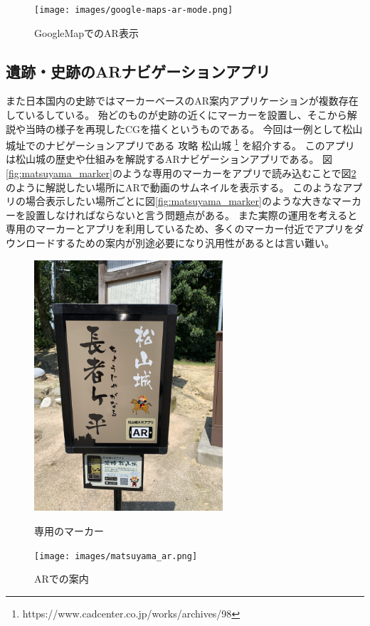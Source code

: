 \begin{figure}[h]
  \begin{center}
      \texttt{[image: images/google-maps-ar-mode.png]}
  \end{center}
  \caption{GoogleMapでのAR表示} \label{fig:googleMapAr}
\end{figure}

\subsection{遺跡・史跡のARナビゲーションアプリ}
また日本国内の史跡ではマーカーベースのAR案内アプリケーションが複数存在しているしている。
殆どのものが史跡の近くにマーカーを設置し、そこから解説や当時の様子を再現したCGを描くというものである。
今回は一例として松山城址でのナビゲーションアプリである 攻略 松山城 \footnote{https://www.cadcenter.co.jp/works/archives/98} を紹介する。
このアプリは松山城の歴史や仕組みを解説するARナビゲーションアプリである。
図\ref{fig:matsuyama_marker}のような専用のマーカーをアプリで読み込むことで図\ref{fig:matsuyama_ar}のように解説したい場所にARで動画のサムネイルを表示する。
このようなアプリの場合表示したい場所ごとに図\ref{fig:matsuyama_marker}のような大きなマーカーを設置しなければならないと言う問題点がある。
また実際の運用を考えると専用のマーカーとアプリを利用しているため、多くのマーカー付近でアプリをダウンロードするための案内が別途必要になり汎用性があるとは言い難い。


\begin{figure}[htbp]
  \begin{minipage}{0.5\hsize}
    \centering
    \includegraphics[width=70mm]{images/matsuyama_marker.jpg}
    \caption{専用のマーカー} \label{fig:matsuyama_marker}
  \end{minipage}
  \begin{minipage}{0.5\hsize}
    \centering
    \texttt{[image: images/matsuyama\_ar.png]}
    \caption{ARでの案内} \label{fig:matsuyama_ar}
  \end{minipage}
\end{figure}


